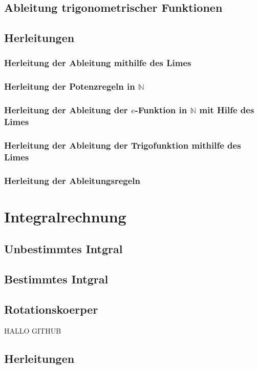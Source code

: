 \documentclass[a4paper]{article} %
\begin{document}
	\subsection{Ableitung trigonometrischer Funktionen}
	\subsection{Herleitungen}
	\subsubsection{Herleitung der Ableitung mithilfe des Limes}
	\subsubsection{Herleitung der Potenzregeln in  $\mathbb{N}$}
	\subsubsection{Herleitung der Ableitung der $e$-Funktion in $\mathbb{N}$ mit Hilfe des Limes}
	\subsubsection{Herleitung der Ableitung der Trigofunktion mithilfe des Limes}
	\subsubsection{Herleitung der Ableitungsregeln}
	\section{Integralrechnung}
	\subsection{Unbestimmtes Intgral}
	\subsection{Bestimmtes Intgral}

	\subsection{Rotationskoerper}  
	HALLO GITHUB                                                       
	\subsection{Herleitungen}
\end{document}
